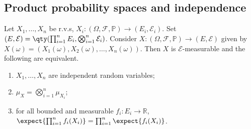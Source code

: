 \subsection{Product probability spaces and independence}
\begin{proposition}
	Let $X_1, \dots, X_n$ be r.v.s, $X_i : (\Omega, \mathcal F, \mathbb P) \to (E_i, \mathcal{E}_i)$.
	Set $(E, \mathcal E) = \qty(\prod_{i=1}^n E_i, \bigotimes_{i=1}^n \mathcal E_i)$.
	Consider $X \colon (\Omega, \mathcal F, \mathbb{P}) \to (E, \mathcal E)$ given by $X(\omega) = (X_1(\omega), X_2(\omega), \dots, X_n(\omega))$.
	Then $X$ is $\mathcal{E}$-measurable and the following are equivalent.
	\begin{enumerate}
		\item $X_1, \dots, X_n$ are independent random variables;
		\item $\mu_X = \bigotimes_{i=1}^n \mu_{X_i}$;
		\item for all bounded and measurable $f_i \colon E_i \to \mathbb R$, $\expect{\prod_{i=1}^n f_i(X_i)} = \prod_{i=1}^n \expect{f_i(X_i)}$.
	\end{enumerate}
\end{proposition}

